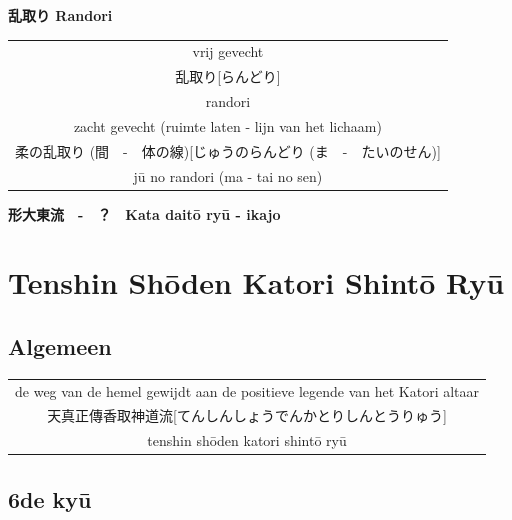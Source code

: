 \documentclass[a4paper, 12pt]{article}
\begin{document}
\begin{CJK}{UTF8}{min}
\begin{center}
    \textbf{乱取り Randori}
\end{center}
\begin{table}[H]
\begin{center}
\begin{tabular}{c}
vrij gevecht\\
乱取り[らんどり]\\
randori\\
\hline
zacht gevecht (ruimte laten - lijn van het lichaam)\\
柔の乱取り (間　-　体の線)[じゅうのらんどり (ま　-　たいのせん)] \\
j\={u} no randori (ma - tai no sen)
\end{tabular}
\end{center}
\label{randori}
\end{table}

\begin{center}
    \textbf{形大東流　-　？　Kata dait\={o} ry\={u} - ikajo}
\end{center}

\newpage
\section{Tenshin Sh\={o}den Katori Shint\={o} Ry\={u}}
\subsection{Algemeen}
\begin{table}[H]
\begin{center}
\begin{tabular}{c}
de weg van de hemel gewijdt aan de positieve legende van het Katori altaar\\ 
天真正傳香取神道流[てんしんしょうでんかとりしんとうりゅう]\\
tenshin sh\={o}den katori shint\={o} ry\={u}
\end{tabular}
\end{center}
\label{katori}
\end{table}


\subsection{6de ky\={u}}

\end{CJK}
\end{document}
